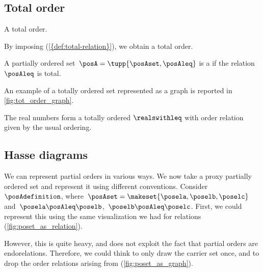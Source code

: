 \vfill

\subsection{Total order}
\begin{marginfigure}
    \centering
    \caption{A total order.}
    \label{fig:tot_order_graph}
\end{marginfigure}
By imposing \emph{} (\cref{{def:total-relation}}), we obtain a total order.

\begin{ctdefinition}
    \label{def:total-order}
    A partially ordered set~$\posA = \tupp{\posAset,{{\posAleq}}}$ is a  if the relation~$\posAleq$ is total.
\end{ctdefinition}

An example of a totally ordered set represented as a graph is reported in \cref{fig:tot_order_graph}.

\begin{example}[Reals]
    The real numbers \reals form a totally ordered  $\realswithleq$ with order relation given by the usual ordering.
\end{example}
\vfill
\clearpage

\subsection{Hasse diagrams}
We can represent partial orders in various ways.
We now take a proxy partially ordered set and represent it using different conventions.
Consider~$\posAdefinition$, where~$\posAset=\makeset{\posela,\poselb,\poselc}$ and~$\posela\posAleq \poselb$,~$\poselb\posAleq \poselc$.
First, we could represent this using the same visualization we had for relations (\cref{fig:poset_as_relation}).

However, this is quite heavy, and does not exploit the fact that partial orders are endorelations.
Therefore, we could think to only draw the carrier set once, and to drop the order relations arising from  (\cref{fig:poset_as_graph}).

